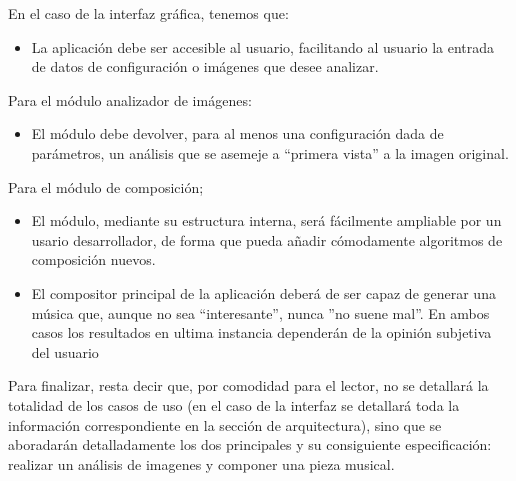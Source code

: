 En el caso de la interfaz gráfica, tenemos que:

\begin{itemize}
	\item La aplicación debe ser accesible al usuario, facilitando al usuario la entrada de datos de configuración o imágenes que desee analizar.

\end{itemize}

Para el módulo analizador de imágenes:

\begin{itemize}
	\item El módulo debe devolver, para al menos una configuración dada de parámetros, un análisis que se asemeje a ``primera vista'' a la imagen original.
\end{itemize}

Para el módulo de composición;
\begin{itemize}
	\item El módulo, mediante su estructura interna, será fácilmente ampliable por un usario desarrollador, de forma que pueda añadir cómodamente algoritmos de composición nuevos.
	\item El compositor principal de la aplicación deberá de ser capaz de generar una música que, aunque no sea ``interesante'', nunca ''no suene mal''. En ambos casos los resultados en ultima instancia dependerán de la opinión subjetiva del usuario
\end{itemize}

Para finalizar, resta decir que, por comodidad para el lector, no se detallará la totalidad de los casos de uso (en el caso de la interfaz se detallará toda la información correspondiente en la sección de arquitectura), sino que se aboradarán detalladamente los dos principales y su consiguiente especificación: realizar un análisis de imagenes y componer una pieza musical.






























